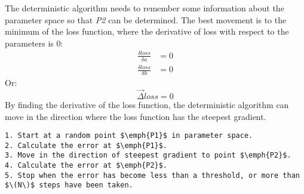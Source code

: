The deterministic algorithm needs to remember some information about the parameter space so that \emph{P2} can be determined. The best movement is to the minimum of the loss function, where the derivative of loss with respect to the parameters is 0:
\begin{align*}
    \frac{\delta loss}{\delta a} & = 0 \\
    \frac{\delta loss}{\delta b} & = 0
\end{align*}
Or:
\begin{equation*}
    \vec{\Delta} loss = 0
\end{equation*}
By finding the derivative of the loss function, the deterministic algorithm can move in the direction where the loss function has the steepest gradient.

\begin{lstlisting}
1. Start at a random point $\emph{P1}$ in parameter space.
2. Calculate the error at $\emph{P1}$.
3. Move in the direction of steepest gradient to point $\emph{P2}$.
4. Calculate the error at $\emph{P2}$.
5. Stop when the error has become less than a threshold, or more than $\(N\)$ steps have been taken.
\end{lstlisting}
